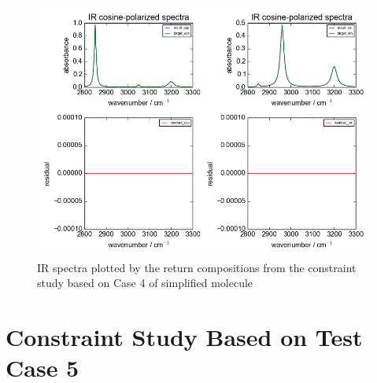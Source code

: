 \begin{figure}[!ht] 
\centering
\includegraphics[scale=0.7]{Figures/toy_model_result_plotting_ir_sin_4candi_constraint_study_experiment4.png} 
\caption{IR spectra plotted by the return compositions from the constraint study based on Case 4 of simplified molecule}\label{fig:3.5}
\end{figure}


\section{Constraint Study Based on Test Case 5}

